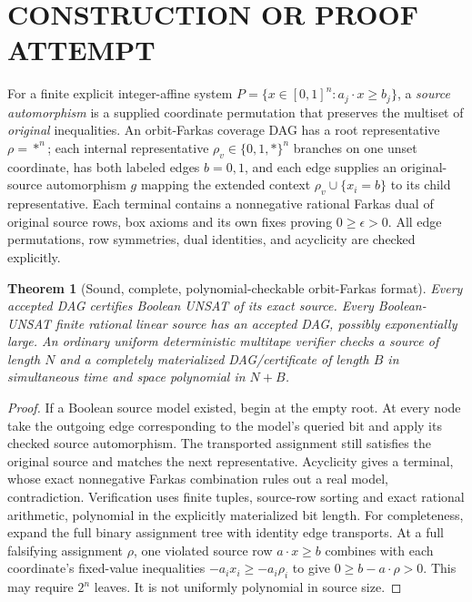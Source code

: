 \documentclass{article}
\newtheorem{theorem}{Theorem}
\begin{document}
\section{CONSTRUCTION OR PROOF ATTEMPT}
For a finite explicit integer-affine system $P=\{x\in[0,1]^n:a_j\cdot x\ge b_j\}$, a \emph{source automorphism} is a supplied coordinate permutation that preserves the multiset of \emph{original} inequalities. An orbit-Farkas coverage DAG has a root representative $\rho=*^n$; each internal representative $\rho_v\in\{0,1,*\}^n$ branches on one unset coordinate, has both labeled edges $b=0,1$, and each edge supplies an original-source automorphism $g$ mapping the extended context $\rho_v\cup\{x_i=b\}$ to its child representative. Each terminal contains a nonnegative rational Farkas dual of original source rows, box axioms and its own fixes proving $0\ge\epsilon>0$. All edge permutations, row symmetries, dual identities, and acyclicity are checked explicitly.

\begin{theorem}[Sound, complete, polynomial-checkable orbit-Farkas format]
Every accepted DAG certifies Boolean UNSAT of its exact source. Every Boolean-UNSAT finite rational linear source has an accepted DAG, possibly exponentially large. An ordinary uniform deterministic multitape verifier checks a source of length $N$ and a completely materialized DAG/certificate of length $B$ in simultaneous time and space polynomial in $N+B$.
\end{theorem}
\begin{proof}
If a Boolean source model existed, begin at the empty root. At every node take the outgoing edge corresponding to the model's queried bit and apply its checked source automorphism. The transported assignment still satisfies the original source and matches the next representative. Acyclicity gives a terminal, whose exact nonnegative Farkas combination rules out a real model, contradiction. Verification uses finite tuples, source-row sorting and exact rational arithmetic, polynomial in the explicitly materialized bit length. For completeness, expand the full binary assignment tree with identity edge transports. At a full falsifying assignment $\rho$, one violated source row $a\cdot x\ge b$ combines with each coordinate's fixed-value inequalities $-a_ix_i\ge-a_i\rho_i$ to give $0\ge b-a\cdot\rho>0$. This may require $2^n$ leaves. It is not uniformly polynomial in source size.
\end{proof}
\end{document}
